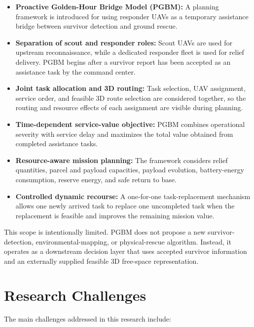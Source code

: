 \begin{itemize}
    \item \textbf{Proactive Golden-Hour Bridge Model (PGBM):}
    A planning framework is introduced for using responder UAVs as a temporary
    assistance bridge between survivor detection and ground rescue.

    \item \textbf{Separation of scout and responder roles:}
    Scout UAVs are used for upstream reconnaissance, while a dedicated
    responder fleet is used for relief delivery. PGBM begins after a survivor
    report has been accepted as an assistance task by the command center.

    \item \textbf{Joint task allocation and 3D routing:}
    Task selection, UAV assignment, service order, and feasible 3D route
    selection are considered together, so the routing and resource effects of
    each assignment are visible during planning.

    \item \textbf{Time-dependent service-value objective:}
    PGBM combines operational severity with service delay and maximizes the
    total value obtained from completed assistance tasks.

    \item \textbf{Resource-aware mission planning:}
    The framework considers relief quantities, parcel and payload capacities,
    payload evolution, battery-energy consumption, reserve energy, and safe
    return to base.

    \item \textbf{Controlled dynamic recourse:}
    A one-for-one task-replacement mechanism allows one newly arrived task to
    replace one uncompleted task when the replacement is feasible and improves
    the remaining mission value.
\end{itemize}

This scope is intentionally limited. PGBM does not propose a new
survivor-detection, environmental-mapping, or physical-rescue algorithm.
Instead, it operates as a downstream decision layer that uses accepted survivor
information and an externally supplied feasible 3D free-space representation.

\section{Research Challenges}

The main challenges addressed in this research include:

